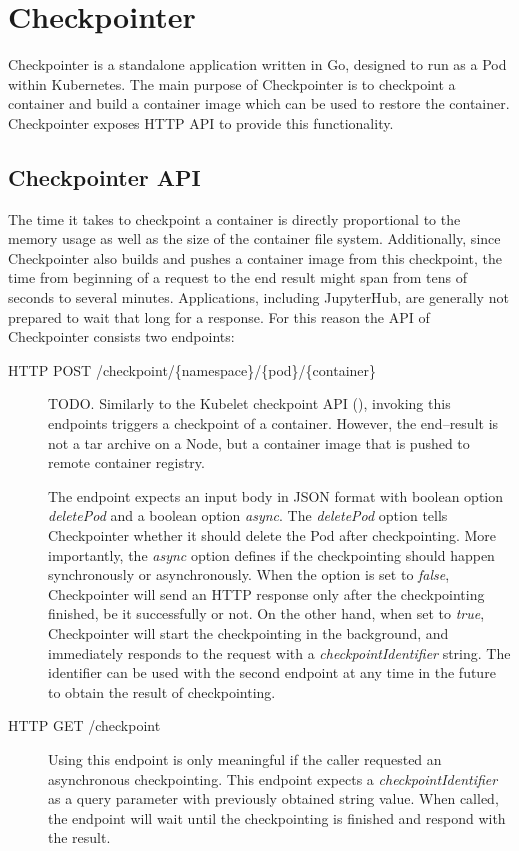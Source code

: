 \documentclass[
  digital,     %
  oneside,     %
  nosansbold,  %
  nocolorbold, %
  lof,         %
  lot,         %
]{fithesis4}
\begin{document}
\chapter{Checkpointer}
\label{chap:checkpointer}

Checkpointer is a standalone application written in Go, designed to run as a Pod within Kubernetes. The main purpose of Checkpointer is to checkpoint a container and build a container image which can be used to restore the container. Checkpointer exposes HTTP API to provide this functionality.


\section{Checkpointer API}
The time it takes to checkpoint a container is directly proportional to the memory usage as well as the size of the container file system. Additionally, since Checkpointer also builds and pushes a container image from this checkpoint, the time from beginning of a request to the end result might span from tens of seconds to several minutes. Applications, including JupyterHub, are generally not prepared to wait that long for a response. For this reason the API of Checkpointer consists two endpoints:

\begin{description}
    \item[ HTTP POST /checkpoint/\{namespace\}/\{pod\}/\{container\}]

TODO. Similarly to the Kubelet checkpoint API (), invoking this endpoints triggers a checkpoint of a container. However, the end--result is not a tar archive on a Node, but a container image that is pushed to remote container registry.

The endpoint expects an input body in JSON format with boolean option \emph{deletePod} and a boolean option \emph{async}. The \emph{deletePod} option tells Checkpointer whether it should delete the Pod after checkpointing. More importantly, the \emph{async} option defines if the checkpointing should happen synchronously or asynchronously. When the option is set to \emph{false}, Checkpointer will send an HTTP response only after the checkpointing finished, be it successfully or not. On the other hand, when set to \emph{true}, Checkpointer will start the checkpointing in the background, and immediately responds to the request with a \emph{checkpointIdentifier} string. The identifier can be used with the second endpoint at any time in the future to obtain the result of checkpointing.

    \item[ HTTP GET /checkpoint] Using this endpoint is only meaningful if the caller requested an asynchronous checkpointing. This endpoint expects a \emph{checkpointIdentifier} as a query parameter with previously obtained string value. When called, the endpoint will wait until the checkpointing is finished and respond with the result.
\end{description}
\end{document}
